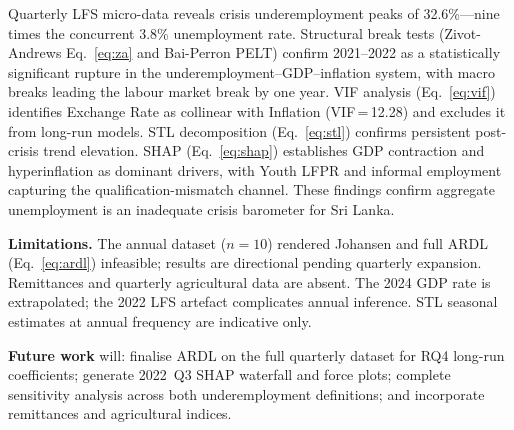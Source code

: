 \documentclass[sigconf]{acmart}
\begin{document}
Quarterly LFS micro-data reveals crisis underemployment peaks of 32.6\%---nine times the concurrent 3.8\% unemployment rate. Structural break tests (Zivot-Andrews Eq.~\ref{eq:za} and Bai-Perron PELT) confirm 2021--2022 as a statistically significant rupture in the underemployment--GDP--inflation system, with macro breaks leading the labour market break by one year. VIF analysis (Eq.~\ref{eq:vif}) identifies Exchange Rate as collinear with Inflation (VIF\,=\,12.28) and excludes it from long-run models. STL decomposition (Eq.~\ref{eq:stl}) confirms persistent post-crisis trend elevation. SHAP (Eq.~\ref{eq:shap}) establishes GDP contraction and hyperinflation as dominant drivers, with Youth LFPR and informal employment capturing the qualification-mismatch channel. These findings confirm aggregate unemployment is an inadequate crisis barometer for Sri Lanka.

\textbf{Limitations.} The annual dataset ($n{=}10$) rendered Johansen and full ARDL (Eq.~\ref{eq:ardl}) infeasible; results are directional pending quarterly expansion. Remittances and quarterly agricultural data are absent. The 2024 GDP rate is extrapolated; the 2022 LFS artefact complicates annual inference. STL seasonal estimates at annual frequency are indicative only.

\textbf{Future work} will: finalise ARDL on the full quarterly dataset for RQ4 long-run coefficients; generate 2022~Q3 SHAP waterfall and force plots; complete sensitivity analysis across both underemployment definitions; and incorporate remittances and agricultural indices.



\end{document}

